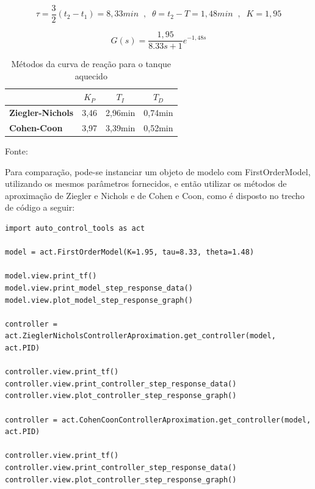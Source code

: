 \begin{equation}
    \label{eq:bib_comp_1_id}
    \tau = \frac{3}{2}(t_2 - t_1) = 8,33min \;\;,\;\; \theta = t_2 - T = 1,48min \;\;,\;\; K=1,95
\end{equation}

\begin{equation}
    \label{eq:bib_comp_1_model}
    G(s) = \frac{1,95}{8.33 s + 1}e^{-1,48 s}
\end{equation}

\begin{table}[h]
    \begin{center}
        \begin{tabular}{ | l | c | c | c | }
            \hline
            {}                         & {$K_P$} & {$T_I$}   & {$T_D$}   \\
            \hline
            {\textbf{Ziegler-Nichols}} & {3,46}  & {2,96min} & {0,74min} \\
            \hline
            {\textbf{Cohen-Coon}}      & {3,97}  & {3,39min} & {0,52min} \\
            \hline
        \end{tabular}
        \caption{ Métodos da curva de reação para o tanque aquecido}
        \vspace{0cm}\hspace{0cm}\small{Fonte: \cite{apostpidsint}}
        \label{tab:bib_comp_1_restb}
    \end{center}
\end{table}

Para comparação, pode-se instanciar um objeto de modelo com FirstOrderModel, utilizando os mesmos parâmetros fornecidos,
e então utilizar os métodos de aproximação de Ziegler e Nichols e de Cohen e Coon, como é disposto no trecho de código
a seguir:
\begin{lstlisting}[label={lst:bib_comp_1_code1}]
import auto_control_tools as act

model = act.FirstOrderModel(K=1.95, tau=8.33, theta=1.48)

model.view.print_tf()
model.view.print_model_step_response_data()
model.view.plot_model_step_response_graph()

controller = act.ZieglerNicholsControllerAproximation.get_controller(model, act.PID)

controller.view.print_tf()
controller.view.print_controller_step_response_data()
controller.view.plot_controller_step_response_graph()

controller = act.CohenCoonControllerAproximation.get_controller(model, act.PID)

controller.view.print_tf()
controller.view.print_controller_step_response_data()
controller.view.plot_controller_step_response_graph()
\end{lstlisting}

